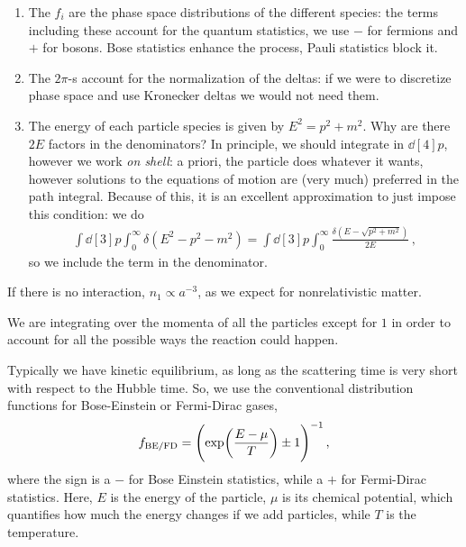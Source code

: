 \documentclass[main.tex]{subfiles}
\begin{document}
\begin{enumerate}
  \item The \(f_{i}\) are the phase space distributions of the different species: the terms including these account for the quantum statistics, we use \(-\) for fermions and \(+\) for bosons. Bose statistics enhance the process, Pauli statistics block it. 
  \item The \(2\pi \)-s account for the normalization of the deltas: if we were to discretize phase space and use Kronecker deltas we would not need them. 
  \item The energy of each particle species is given by  \(E^2 = p^2+m^2\). 
  Why are there \(2E\) factors in the denominators? In principle, we should integrate in \(\dd[4]{p}\), however we work \emph{on shell}: a priori, the particle does whatever it wants, however solutions to the equations of motion are (very much) preferred in the path integral.
  Because of this, it is an excellent approximation to just impose this condition: we do 
  \begin{align}
  \int \dd[3]{p} \int_{0}^{ \infty } \delta (E^2- p^2-m^2) 
  = \int \dd[3]{p} \int_{0}^{ \infty } \frac{ \delta (E - \sqrt{p^2+m^2})}{2E}
  \,,
  \end{align}
  so we include the term in the denominator. 
\end{enumerate}


If there is no interaction, \(n_1 \propto a^{-3}\), as we expect for nonrelativistic matter. 

We are integrating over the momenta of all the particles except for \(1\) in order to account for all the possible ways the reaction could happen. 


Typically we have kinetic equilibrium, as long as the scattering time is very short with respect to the Hubble time. 
So, we use the conventional distribution functions for Bose-Einstein or Fermi-Dirac gases,
%
\begin{align}
f_{\text{BE/FD}} = \qty(\exp(\frac{E- \mu }{T}) \pm 1)^{-1}
\,,
\end{align}
%
where the sign is a \(-\) for Bose Einstein statistics, while a \(+\) for Fermi-Dirac statistics. 
Here, \(E\) is the energy of the particle, \(\mu \) is its chemical potential, which quantifies how much the energy changes if we add particles, while \(T\) is the temperature. 
\end{document}

